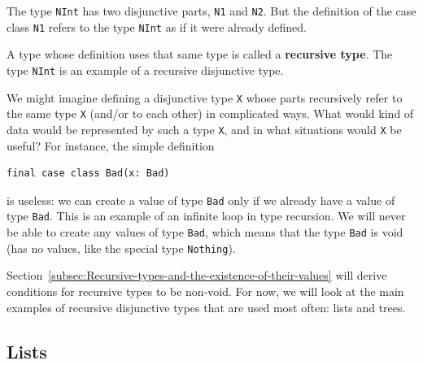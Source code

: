 \noindent The type \lstinline!NInt! has two disjunctive parts, \lstinline!N1!
and \lstinline!N2!. But the definition of the case class \lstinline!N1!
refers to the type \lstinline!NInt! as if it were already defined. 

A type whose definition uses that same type is called a \textbf{recursive
type}. The type \lstinline!NInt! is an example of a recursive disjunctive
type.

We might imagine defining a disjunctive type \lstinline!X! whose
parts recursively refer to the same type \lstinline!X! (and/or to
each other) in complicated ways. What would kind of data would be
represented by such a type \lstinline!X!, and in what situations
would \lstinline!X! be useful? For instance, the simple definition
\begin{lstlisting}
final case class Bad(x: Bad)
\end{lstlisting}
is useless: we can create a value of type \lstinline!Bad! only if
we already have a value of type \lstinline!Bad!. This is an example
of an infinite loop in type recursion.
We will never be able to create any values of type \lstinline!Bad!,
which means that the type \lstinline!Bad! is void
(has no values, like the special type \lstinline!Nothing!). 

Section~\ref{subsec:Recursive-types-and-the-existence-of-their-values}
will derive conditions for recursive types to be non-void. For now,
we will look at the main examples of recursive disjunctive types that
are used most often: lists and trees.

\subsection{Lists}

